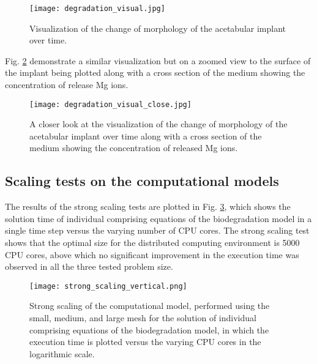 \begin{figure}[h]
\centering
\medskip
\texttt{[image: degradation\_visual.jpg]}
\caption[Visualization of the change of morphology of the acetabular implant]{Visualization of the change of morphology of the acetabular implant over time.} \label{fig:cup_degradation_visual}
\end{figure}

Fig. \ref{fig:cup_degradation_visual_close} demonstrate a similar visualization but on a zoomed view to the surface of the implant being plotted along with a cross section of the medium showing the concentration of release Mg ions.

\begin{figure}[h]
\centering
\medskip
\texttt{[image: degradation\_visual\_close.jpg]}
\caption[Visualization of the change of morphology of the acetabular implant]{A closer look at the visualization of the change of morphology of the acetabular implant over time along with a cross section of the medium showing the concentration of released Mg ions.} \label{fig:cup_degradation_visual_close}
\end{figure}

\subsection{Scaling tests on the computational models}

The results of the strong scaling tests are plotted in Fig. \ref{fig:cup_strong_scaling}, which shows the solution time of individual comprising equations of the biodegradation model in a single time step versus the varying number of CPU cores. The strong scaling test shows that the optimal size for the distributed computing environment is \num{5000} CPU cores, above which no significant improvement in the execution time was observed in all the three tested problem size.

\begin{figure}[h]
\centering
\medskip
\texttt{[image: strong\_scaling\_vertical.png]}
\caption[Strong scaling of individual components of the biodegradation model]{Strong scaling of the computational model, performed using the small, medium, and large mesh for the solution of individual comprising equations of the biodegradation model, in which the execution time is plotted versus the varying CPU cores in the logarithmic scale.} \label{fig:cup_strong_scaling}
\end{figure}


